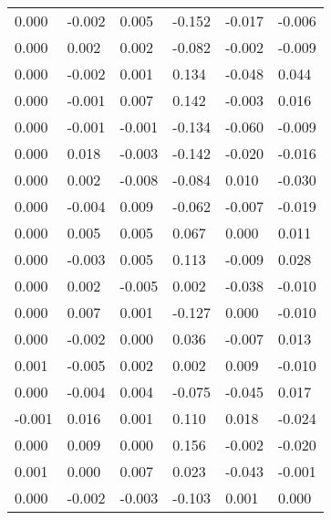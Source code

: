 \begin{longtable}{llllll}
0.000        & -0.002             & 0.005             & -0.152      & -0.017      & -0.006       \\
0.000        & 0.002              & 0.002             & -0.082      & -0.002      & -0.009       \\
0.000        & -0.002             & 0.001             & 0.134       & -0.048      & 0.044        \\
0.000        & -0.001             & 0.007             & 0.142       & -0.003      & 0.016        \\
0.000        & -0.001             & -0.001            & -0.134      & -0.060      & -0.009       \\
0.000        & 0.018              & -0.003            & -0.142      & -0.020      & -0.016       \\
0.000        & 0.002              & -0.008            & -0.084      & 0.010       & -0.030       \\
0.000        & -0.004             & 0.009             & -0.062      & -0.007      & -0.019       \\
0.000        & 0.005              & 0.005             & 0.067       & 0.000       & 0.011        \\
0.000        & -0.003             & 0.005             & 0.113       & -0.009      & 0.028        \\
0.000        & 0.002              & -0.005            & 0.002       & -0.038      & -0.010       \\
0.000        & 0.007              & 0.001             & -0.127      & 0.000       & -0.010       \\
0.000        & -0.002             & 0.000             & 0.036       & -0.007      & 0.013        \\
0.001        & -0.005             & 0.002             & 0.002       & 0.009       & -0.010       \\
0.000        & -0.004             & 0.004             & -0.075      & -0.045      & 0.017        \\
-0.001       & 0.016              & 0.001             & 0.110       & 0.018       & -0.024       \\
0.000        & 0.009              & 0.000             & 0.156       & -0.002      & -0.020       \\
0.001        & 0.000              & 0.007             & 0.023       & -0.043      & -0.001       \\
0.000        & -0.002             & -0.003            & -0.103      & 0.001       & 0.000        \\

\end{longtable}

